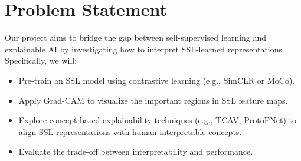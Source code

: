\section{Problem Statement}
\label{sec:problem_statement}

Our project aims to bridge the gap between self-supervised learning and explainable AI by investigating how to interpret SSL-learned representations. Specifically, we will:
\begin{itemize}
    \item Pre-train an SSL model using contrastive learning (e.g., SimCLR or MoCo).
    \item Apply Grad-CAM to visualize the important regions in SSL feature maps.
    \item Explore concept-based explainability techniques (e.g., TCAV, ProtoPNet) to align SSL representations with human-interpretable concepts.
    \item Evaluate the trade-off between interpretability and performance.
\end{itemize}
